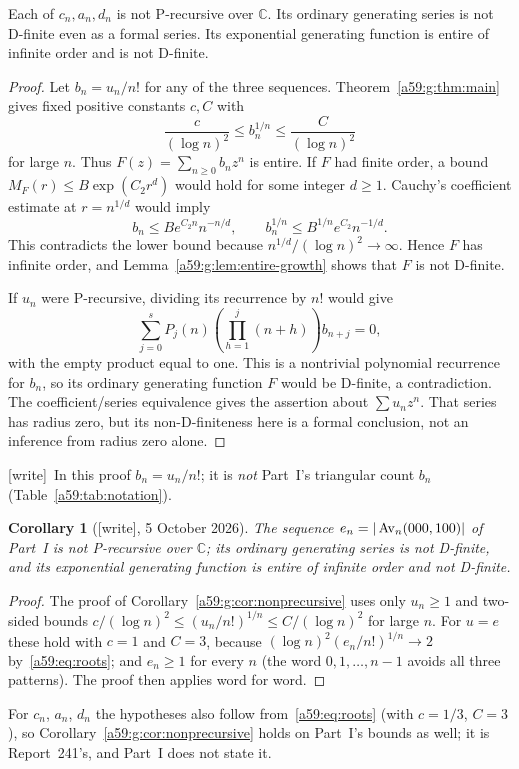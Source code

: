 \documentclass[11pt,letterpaper]{article}
\theoremstyle{remark}\newtheorem{remark}[theorem]{Remark}
\newcommand{\wtag}{\textup{[write]}}
\theoremstyle{remark}\newtheorem{wremark}{Remark}\renewcommand{\thewremark}{W\arabic{wremark}}
\theoremstyle{plain}\newtheorem{wcorollary}[wremark]{Corollary}
\begin{document}
\begin{corollary}\label{a59:g:cor:nonprecursive}
Each of $c_n,a_n,d_n$ is not P-recursive over $\mathbb C$. Its ordinary generating series is not D-finite even as a formal series. Its exponential generating function is entire of infinite order and is not D-finite.
\end{corollary}
\begin{proof}
Let $b_n=u_n/n!$ for any of the three sequences. Theorem~\ref{a59:g:thm:main} gives fixed positive constants $c,C$ with
\[
 \frac{c}{(\log n)^2}\leq b_n^{1/n}\leq\frac{C}{(\log n)^2}
\]
for large $n$. Thus $F(z)=\sum_{n\geq0}b_nz^n$ is entire. If $F$ had finite order, a bound $M_F(r)\leq B\exp(C_2r^d)$ would hold for some integer $d\geq1$. Cauchy's coefficient estimate at $r=n^{1/d}$ would imply
\[
 b_n\leq B e^{C_2n}n^{-n/d},\qquad
 b_n^{1/n}\leq B^{1/n}e^{C_2}n^{-1/d}.
\]
This contradicts the lower bound because $n^{1/d}/(\log n)^2\to\infty$. Hence $F$ has infinite order, and Lemma~\ref{a59:g:lem:entire-growth} shows that $F$ is not D-finite.

If $u_n$ were P-recursive, dividing its recurrence by $n!$ would give
\[
 \sum_{j=0}^s P_j(n)\left(\prod_{h=1}^j(n+h)\right)b_{n+j}=0,
\]
with the empty product equal to one. This is a nontrivial polynomial recurrence for $b_n$, so its ordinary generating function $F$ would be D-finite, a contradiction. The coefficient/series equivalence gives the assertion about $\sum u_nz^n$. That series has radius zero, but its non-D-finiteness here is a formal conclusion, not an inference from radius zero alone.
\end{proof}
\noindent\wtag\ In this proof $b_n=u_n/n!$; it is \emph{not} Part~I's
triangular count $b_n$ (Table~\ref{a59:tab:notation}).

\begin{wcorollary}[\wtag, 5 October 2026]\label{a59:g:cor:enonp}
The sequence $e_n=|\operatorname{Av}_n(000,100)|$ of Part~I is not P-recursive over
$\mathbb C$; its ordinary generating series is not D-finite, and its
exponential generating function is entire of infinite order and not
D-finite.
\end{wcorollary}
\begin{proof}
The proof of Corollary~\ref{a59:g:cor:nonprecursive} uses only $u_n\ge1$
and two-sided bounds $c/(\log n)^2\le(u_n/n!)^{1/n}\le C/(\log n)^2$ for
large $n$. For $u=e$ these hold with $c=1$ and $C=3$, because
$(\log n)^2(e_n/n!)^{1/n}\to2$ by~\eqref{a59:eq:roots}; and $e_n\ge1$ for
every $n$ (the word $0,1,\dots,n-1$ avoids all three patterns). The proof
then applies word for word.
\end{proof}
\noindent For $c_n$, $a_n$, $d_n$ the hypotheses also follow
from~\eqref{a59:eq:roots} (with $c=1/3$, $C=3$), so
Corollary~\ref{a59:g:cor:nonprecursive} holds on Part~I's bounds as well; it
is Report~241's, and Part~I does not state it.
\end{document}
